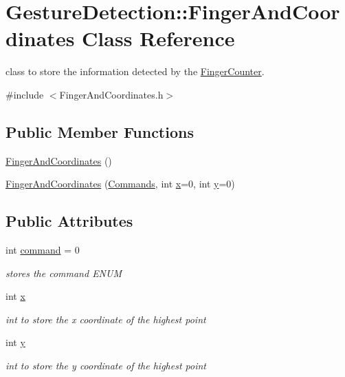 \hypertarget{classGestureDetection_1_1FingerAndCoordinates}{}\section{Gesture\+Detection\+:\+:Finger\+And\+Coordinates Class Reference}
\label{classGestureDetection_1_1FingerAndCoordinates}


class to store the information detected by the \hyperlink{classGestureDetection_1_1FingerCounter}{Finger\+Counter}.  




{\ttfamily \#include $<$Finger\+And\+Coordinates.\+h$>$}

\subsection*{Public Member Functions}
\begin{DoxyCompactItemize}
\item 
\hyperlink{classGestureDetection_1_1FingerAndCoordinates_a9d24b8b3b3237f0a39762a52daf6f6a5}{Finger\+And\+Coordinates} ()
\item 
\hyperlink{classGestureDetection_1_1FingerAndCoordinates_a907ced00a2a2075194c38b9a356bfb60}{Finger\+And\+Coordinates} (\hyperlink{Commands_8h_a1939e90743463fb34c8c571ec0590430}{Commands}, int \hyperlink{classGestureDetection_1_1FingerAndCoordinates_ad4442375646440085aafa4d366b2eb6b}{x}=0, int \hyperlink{classGestureDetection_1_1FingerAndCoordinates_a2e975227cf1ed24857600d35ee84e258}{y}=0)
\end{DoxyCompactItemize}
\subsection*{Public Attributes}
\begin{DoxyCompactItemize}
\item 
int \hyperlink{classGestureDetection_1_1FingerAndCoordinates_a1235facd3de69e4e6fd8a3326e140d18}{command} = 0
\begin{DoxyCompactList}\small\item\em stores the command E\+N\+UM \end{DoxyCompactList}\item 
int \hyperlink{classGestureDetection_1_1FingerAndCoordinates_ad4442375646440085aafa4d366b2eb6b}{x}
\begin{DoxyCompactList}\small\item\em int to store the x coordinate of the highest point \end{DoxyCompactList}\item 
int \hyperlink{classGestureDetection_1_1FingerAndCoordinates_a2e975227cf1ed24857600d35ee84e258}{y}
\begin{DoxyCompactList}\small\item\em int to store the y coordinate of the highest point \end{DoxyCompactList}\end{DoxyCompactItemize}


